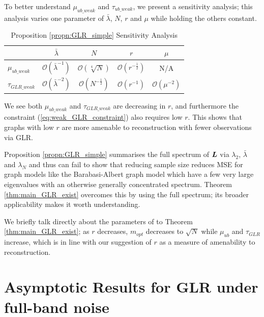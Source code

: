 To better understand $\mu_{ub\_weak}$ and $\tau_{ub\_weak}$, we present a sensitivity analysis; this analysis varies one parameter of $\bar{\lambda}$, $N$, $r$ and $\mu$ while holding the others constant.

\begin{table}[h]
\caption{Proposition \ref{propn:GLR_simple} Sensitivity Analysis}
\centering
\begin{tabular}{|l|c|c|c|c|} \hline
     \rule{0pt}{8pt}& $\bar{\lambda}$ & $N$ & $r$ & $\mu$ \\ \hline
    \rule{0pt}{8pt} $\mu_{ub\_weak}$ & $\mathcal{O}(\bar{\lambda}^{-1})$ & $\mathcal{O}(\sqrt[4]{N})$ & $\mathcal{O}(r^{-\frac{1}{2}})$ &  N/A \\
    \rule{0pt}{8pt}$\tau_{GLR\_weak}$ & $\mathcal{O}(\bar{\lambda}^{-2})$ & $\mathcal{O}(N^{-\frac{1}{2}})$ & $\mathcal{O}(r^{-1})$ & $\mathcal{O}(\mu^{-2})$ \\ \hline
\end{tabular}
\label{tbl:GLR_sensitivity_simple}
\end{table}

We see both $\mu_{ub\_weak}$ and $\tau_{GLR\_weak}$ are decreasing in $r$, and furthermore the constraint (\ref{eq:weak_GLR_constraint}) also requires low $r$. This shows that graphs with low $r$ are more amenable to reconstruction with fewer observations via GLR.

Proposition \ref{propn:GLR_simple} summarises the full spectrum of $\bm{L}$ via $\lambda_{2}$, $\bar{\lambda}$ and $\lambda_{N}$ and thus can fail to show that reducing sample size reduces MSE for graph models like the Barabasi-Albert graph model which have a few very large eigenvalues with an otherwise generally concentrated spectrum. Theorem \ref{thm:main_GLR_exist} overcomes this by using the full spectrum; its broader applicability makes it worth understanding.

We briefly talk directly about the parameters of to Theorem \ref{thm:main_GLR_exist}; as $r$ decreases, $m_{opt}$ decreases to $\sqrt{N}$ while $\mu_{ub}$ and $\tau_{GLR}$ increase, which is in line with our suggestion of $r$ as a measure of amenability to reconstruction.

\section{Asymptotic Results for GLR under full-band noise}
\label{app:Proof_GLR_big_N}

